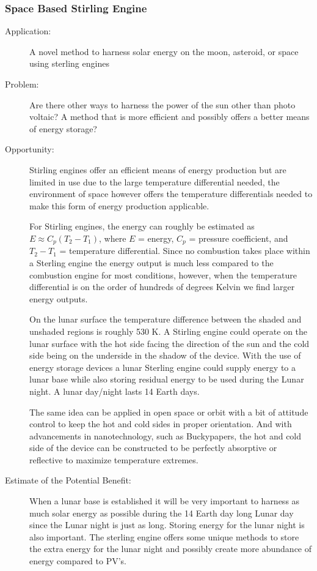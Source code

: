 \subsubsection{Space Based Stirling Engine}
\begin{description}   \item[Application:] A novel method to harness solar energy on the moon,   asteroid, or space using sterling engines
 
\item[Problem:] Are there other   ways to harness the power of the sun other than photo voltaic? A method   that is more efficient and possibly offers a better means of energy   storage?
 
\item[Opportunity:] Stirling   engines offer an efficient means of energy production but are limited  in  use due to the large temperature differential needed, the  environment  of space however offers the temperature differentials  needed to make  this form of energy production applicable. 
 
For Stirling engines, the energy   can roughly be estimated as $E \approx C_{p}(T_{2}-T_{1})$, where $E$ = energy, $C_p$ =  pressure  coefficient, and $T_2 - T_1$ = temperature differential. Since no   combustion takes place within a Sterling engine the energy output is   much less compared to the combustion engine for most conditions,   however, when the temperature differential is on the order of hundreds   of degrees Kelvin we find larger energy outputs. 
 
On the lunar surface the   temperature difference between the shaded and unshaded regions is   roughly 530 K. A Stirling engine could operate on the  lunar surface with  the hot side facing the direction of the sun and the  cold side being on  the underside in the shadow of the device. With the  use of energy  storage devices a lunar Sterling engine could supply  energy to a lunar  base while also storing residual energy to be used  during the Lunar  night. A lunar day/night lasts 14 Earth days.
 
The same idea can be applied in   open space or orbit with a bit of attitude control to keep the hot and   cold sides in proper orientation. And with advancements in  nanotechnology, such as  Buckypapers, the hot and cold side of the device  can be constructed to  be perfectly absorptive or reflective to maximize  temperature extremes.
 
\item[Estimate of the Potential   Benefit:] When a lunar base is established it will be very important to   harness as much solar energy as possible during the 14 Earth day long   Lunar day since the Lunar night is just as long. Storing energy for the   lunar night is also important. The sterling engine offers some unique   methods to store the extra energy for the lunar night and possibly   create more abundance of energy compared to PV's.
\end{description}
 

